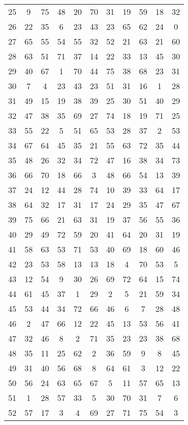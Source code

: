 \begin{table}
\begin{tabular}{c c c c c c c c c c c }
25 & 9 & 75 & 48 & 20 & 70 & 31 & 19 & 59 & 18 & 32 \\
26 & 22 & 35 & 6 & 23 & 43 & 23 & 65 & 62 & 24 & 0 \\
27 & 65 & 55 & 54 & 55 & 32 & 52 & 21 & 63 & 21 & 60 \\
28 & 63 & 51 & 71 & 37 & 14 & 22 & 33 & 13 & 45 & 30 \\
29 & 40 & 67 & 1 & 70 & 44 & 75 & 38 & 68 & 23 & 31 \\
30 & 7 & 4 & 23 & 43 & 23 & 51 & 31 & 16 & 1 & 28 \\
31 & 49 & 15 & 19 & 38 & 39 & 25 & 30 & 51 & 40 & 29 \\
32 & 47 & 38 & 35 & 69 & 27 & 74 & 18 & 19 & 71 & 25 \\
33 & 55 & 22 & 5 & 51 & 65 & 53 & 28 & 37 & 2 & 53 \\
34 & 67 & 64 & 45 & 35 & 21 & 55 & 63 & 72 & 35 & 44 \\
35 & 48 & 26 & 32 & 34 & 72 & 47 & 16 & 38 & 34 & 73 \\
36 & 66 & 70 & 18 & 66 & 3 & 48 & 66 & 54 & 13 & 39 \\
37 & 24 & 12 & 44 & 28 & 74 & 10 & 39 & 33 & 64 & 17 \\
38 & 64 & 32 & 17 & 31 & 17 & 24 & 29 & 35 & 47 & 67 \\
39 & 75 & 66 & 21 & 63 & 31 & 19 & 37 & 56 & 55 & 36 \\
40 & 29 & 49 & 72 & 59 & 20 & 41 & 64 & 20 & 31 & 19 \\
41 & 58 & 63 & 53 & 71 & 53 & 40 & 69 & 18 & 60 & 46 \\
42 & 23 & 53 & 58 & 13 & 13 & 18 & 4 & 70 & 53 & 5 \\
43 & 12 & 54 & 9 & 30 & 26 & 69 & 72 & 64 & 15 & 74 \\
44 & 61 & 45 & 37 & 1 & 29 & 2 & 5 & 21 & 59 & 34 \\
45 & 53 & 44 & 34 & 72 & 66 & 46 & 6 & 7 & 28 & 48 \\
46 & 2 & 47 & 66 & 12 & 22 & 45 & 13 & 53 & 56 & 41 \\
47 & 32 & 46 & 8 & 2 & 71 & 35 & 23 & 23 & 38 & 68 \\
48 & 35 & 11 & 25 & 62 & 2 & 36 & 59 & 9 & 8 & 45 \\
49 & 31 & 40 & 56 & 68 & 8 & 64 & 61 & 3 & 12 & 22 \\
50 & 56 & 24 & 63 & 65 & 67 & 5 & 11 & 57 & 65 & 13 \\
51 & 1 & 28 & 57 & 33 & 5 & 30 & 70 & 31 & 7 & 6 \\
52 & 57 & 17 & 3 & 4 & 69 & 27 & 71 & 75 & 54 & 3 \\

\end{tabular}
\end{table}

